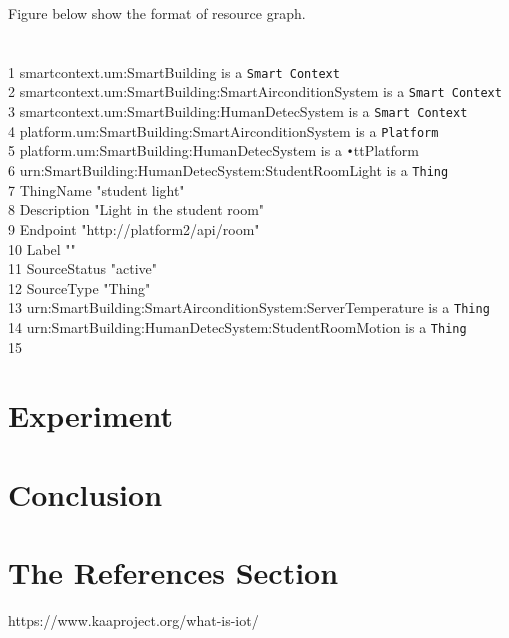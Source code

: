 \documentclass[runningheads,a4paper]{llncs}
\begin{document}
Figure below show the format of resource graph.\\\\\\
1	smartcontext.um:SmartBuilding is a \texttt{Smart Context} \\
2	smartcontext.um:SmartBuilding:SmartAirconditionSystem is a \texttt{Smart Context} \\ 
3 	smartcontext.um:SmartBuilding:HumanDetecSystem is a \texttt{Smart Context} \\
4 	platform.um:SmartBuilding:SmartAirconditionSystem is a \texttt{Platform} \\
5 	platform.um:SmartBuilding:HumanDetecSystem is a \texttt{•}tt{Platform} \\
6 	urn:SmartBuilding:HumanDetecSystem:StudentRoomLight is a \texttt{Thing}\\
7		ThingName "student light" \\ 
8		Description "Light in the student room" \\
9		Endpoint "http://platform2/api/room" \\ 
10		Label "" \\
11		SourceStatus "active" \\
12		SourceType "Thing" \\
13 	urn:SmartBuilding:SmartAirconditionSystem:ServerTemperature is a \texttt{Thing} \\
14 	urn:SmartBuilding:HumanDetecSystem:StudentRoomMotion is a \texttt{Thing} \\
15 	



\section{Experiment}

\section{Conclusion}

\section{The References Section}\label{references}

\begin{thebibliography}{4}

 https://www.kaaproject.org/what-is-iot/

\end{thebibliography}
\end{document}
